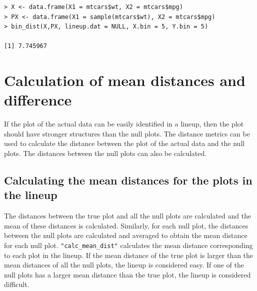 \documentclass[article]{jss}
\begin{document}
\begin{verbatim}
> X <- data.frame(X1 = mtcars$wt, X2 = mtcars$mpg)
> PX <- data.frame(X1 = sample(mtcars$wt), X2 = mtcars$mpg)
> bin_dist(X,PX, lineup.dat = NULL, X.bin = 5, Y.bin = 5)

[1] 7.745967
\end{verbatim}

\section{Calculation of mean distances and difference}

If the plot of the actual data can be easily identified in a lineup, then the plot should have stronger structures than the null plots. The distance metrics can be used to calculate the distance between the plot of the actual data and the null plots. The distances between the null plots can also be calculated. 

\subsection{Calculating the mean distances for the plots in the
lineup}\label{calculating-the-mean-distances-for-the-plots-in-the-lineup}

The distances between the true
plot and all the null plots are calculated and the mean of these
distances is calculated. Similarly, for each null plot, the distances
between the null plots are calculated and
averaged to obtain the mean distance for each null plot.
\texttt{"calc\_mean\_dist"} calculates the mean distance corresponding
to each plot in the lineup. If the mean distance of the true plot is
larger than the mean distances of all the null plots, the lineup is
considered easy. If one of the null plots has a larger mean distance
than the true plot, the lineup is considered difficult.
\end{document}
